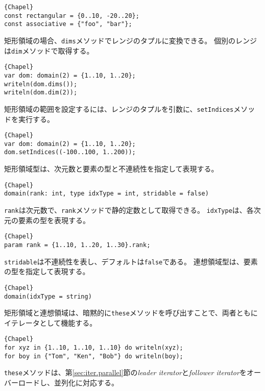 \documentclass[10pt,a4paper]{book}
\begin{document}
\begin{Verbatim}{Chapel}
const rectangular = {0..10, -20..20};
const associative = {"foo", "bar"};
\end{Verbatim}

矩形領域の場合、\verb#dims#メソッドでレンジのタプルに変換できる。
個別のレンジは\verb#dim#メソッドで取得する。

\begin{Verbatim}{Chapel}
var dom: domain(2) = {1..10, 1..20};
writeln(dom.dims());
writeln(dom.dim(2));
\end{Verbatim}

矩形領域の範囲を設定するには、レンジのタプルを引数に、\verb#setIndices#メソッドを実行する。

\begin{Verbatim}{Chapel}
var dom: domain(2) = {1..10, 1..20};
dom.setIndices((-100..100, 1..200));
\end{Verbatim}

矩形領域型は、次元数と要素の型と不連続性を指定して表現する。

\begin{Verbatim}{Chapel}
domain(rank: int, type idxType = int, stridable = false)
\end{Verbatim}

\verb#rank#は次元数で、\verb#rank#メソッドで静的定数として取得できる。
\verb#idxType#は、各次元の要素の型を表現する。

\begin{Verbatim}{Chapel}
param rank = {1..10, 1..20, 1..30}.rank;
\end{Verbatim}

\verb#stridable#は不連続性を表し、デフォルトは\verb#false#である。
連想領域型は、要素の型を指定して表現する。

\begin{Verbatim}{Chapel}
domain(idxType = string)
\end{Verbatim}

矩形領域と連想領域は、暗黙的に\verb#these#メソッドを呼び出すことで、両者ともにイテレータとして機能する。

\begin{Verbatim}{Chapel}
for xyz in {1..10, 1..10, 1..10} do writeln(xyz);
for boy in {"Tom", "Ken", "Bob"} do writeln(boy);
\end{Verbatim}

\verb#these#メソッドは、第\ref{sec:iter.parallel}節の\textit{leader iterator}と\textit{follower iterator}をオーバーロードし、並列化に対応する。
\end{document}
